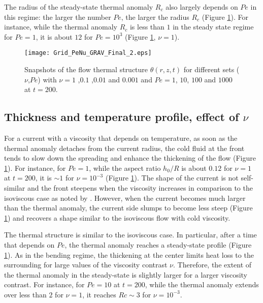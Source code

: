 The  radius of  the steady-state  thermal anomaly  $R_c$ also  largely
depends on $Pe$ in this regime: the larger the number $Pe$, the larger
the  radius  $R_c$  (Figure \ref{C3-Grid_PeNu_GRAV}).   For  instance,
while the thermal  anomaly $R_c$ is less than $1$  in the steady state
regime  for   $Pe=1$,  it   is  about   $12$  for   $Pe=10^3$  (Figure
\ref{C3-Grid_PeNu_GRAV}, $\nu=1$).

\begin{figure}
  \begin{center}
    \graphicspath{ {/Users/thorey/Documents/These/Projet/Refroidissement/Skin_Model/Figure/JFM_V13/} }
    \texttt{[image: Grid\_PeNu\_GRAV\_Final\_2.eps]}
    \caption{Snapshots of  the flow thermal  structure $\theta(r,z,t)$
      for different sets ($\nu$,$Pe$) with $\nu= 1$ ,$0.1$ ,$0.01$ and
      $0.001$ and $Pe=1$, $10$, $100$ and $1000$ at $t=200$.}
    \label{C3-Grid_PeNu_GRAV}
  \end{center}
\end{figure}

\subsection{Thickness and temperature profile, effect of $\nu$}
\label{C3-sec:thickn-temp-prof}

For a current with a viscosity that depends on temperature, as soon as
the thermal anomaly  detaches from the current radius,  the cold fluid
at  the  front tends  to  slow  down  the  spreading and  enhance  the
thickening   of  the   flow  (Figure   \ref{C3-Grid_PeNu_GRAV}).   For
instance, for $Pe=1$,  while the aspect ratio $h_0/R$  is about $0.12$
for  $\nu=1$ at  $t=200$, it  is  $\sim 1$  for $\nu=10^{-3}$  (Figure
\ref{C3-Grid_PeNu_GRAV}).    The  shape   of   the   current  is   not
self-similar and  the front steepens  when the viscosity  increases in
comparison     to    the     isoviscous    case     as    noted     by
\citet{Bercovici:2007vc}.   However,  when  the current  becomes  much
larger than  the thermal  anomaly, the current  side slumps  to become
less  steep  (Figure  \ref{C3-Grid_PeNu_GRAV}) and  recovers  a  shape
similar to the isoviscous flow with cold viscosity.

The  thermal  structure  is  similar   to  the  isoviscous  case.   In
particular, after  a time  that depends on  $Pe$, the  thermal anomaly
reaches a  steady-state profile (Figure  \ref{C3-Grid_PeNu_GRAV}).  As
in the bending  regime, the thickening at the center  limits heat loss
to the surrounding  for large values of the  viscosity contrast $\nu$.
Therefore, the  extent of the  thermal anomaly in the  steady-state is
slightly larger  for a larger  viscosity contrast.  For  instance, for
$Pe=10$ at $t=200$,  while the thermal anomaly extends  over less than
$2$ for $\nu=1$, it reaches $Rc\sim3$ for $\nu=10^{-3}$.

